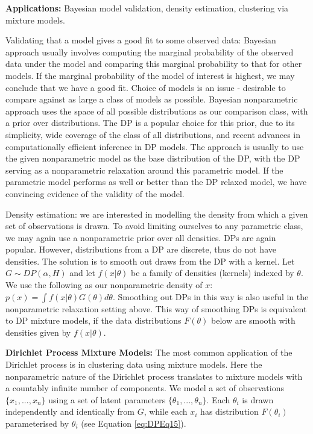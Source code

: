 \textbf{Applications:} Bayesian model validation, density estimation, clustering via mixture models.

Validating that a model gives a good fit to some observed data: Bayesian approach usually involves computing the marginal probability of the observed data under the model and comparing this marginal probability to that for other models. If the marginal probability of the model of interest is highest, we may conclude that we have a good fit. Choice of models is an issue - desirable to compare against as large a class of models as possible. Bayesian nonparametric approach uses the space of all possible distributions as our comparison class, with a prior over distributions. The DP is a popular choice for this prior, due to its simplicity, wide coverage of the class of all distributions, and recent advances in computationally efficient inference in DP models. The approach is usually to use the given nonparametric model as the base distribution of the DP, with the DP serving as a nonparametric relaxation around this parametric model. If the parametric model performs as well or better than the DP relaxed model, we have convincing evidence of the validity of the model.

Density estimation: we are interested in modelling the density from which a given set of observations is drawn. To avoid limiting ourselves to any parametric class, we may again use a nonparametric prior over all densities. DPs are again popular. However, distributions from a DP are discrete, thus do not have densities. The solution is to smooth out draws from the DP with a kernel. Let $G\sim DP(\alpha,H)$ and let $f(x|\theta)$ be a family of densities (kernels) indexed by $\theta$. We use the following as our nonparametric density of $x$: $p(x)=\int f(x|\theta)G(\theta)d\theta$. Smoothing out DPs in this way is also useful in the nonparametric relaxation setting above. This way of smoothing DPs is equivalent to DP mixture models, if the data distributions $F(\theta)$ below are smooth with densities given by $f(x|\theta)$.

\textbf{Dirichlet Process Mixture Models:} The most common application of the Dirichlet process is in clustering data using mixture models. Here the nonparametric nature of the Dirichlet process translates to mixture models with a countably infinite number of components. We model a set of observations $\{x_{1},...,x_{n}\}$ using a set of latent parameters $\{\theta_{1},...,\theta_{n}\}$. Each $\theta_{i}$ is drawn independently and identically from $G$, while each $x_{i}$ has distribution $F(\theta_{i})$ parameterised by $\theta_{i}$ (see Equation \ref{eq:DPEq15}).


